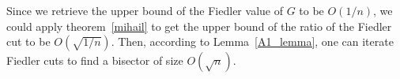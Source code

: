 Since we retrieve the upper bound of the Fiedler value of $G$ to be $O(1/n)$, we could apply theorem~\ref{mihail} to get the upper bound of the ratio of the Fiedler cut to be $O(\sqrt{1/n})$. Then, according to Lemma~\ref{A1_lemma}, one can iterate Fiedler cuts to find a bisector of size $O(\sqrt{n})$.







